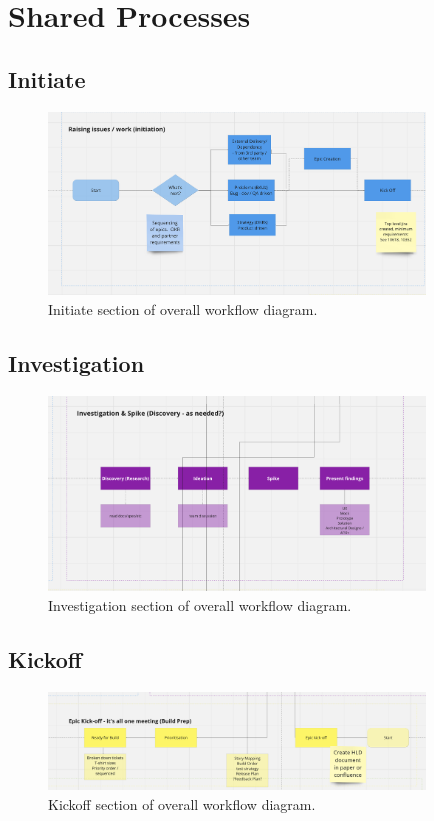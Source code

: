 \section{Shared Processes}

  \subsection{Initiate}
  \begin{figure}[H]
    \centering
    \includegraphics[width=10cm]{assets/workflow/initiate.png}
    \caption{Initiate section of overall workflow diagram.}
    \label{fig:workflowInitiate}
  \end{figure}

  \subsection{Investigation}
  \begin{figure}[H]
    \centering
    \includegraphics[width=10cm]{assets/workflow/investigation.png}
    \caption{Investigation section of overall workflow diagram.}
    \label{fig:workflowInvestigation}
  \end{figure}

  \subsection{Kickoff}
  \begin{figure}[H]
    \centering
    \includegraphics[width=10cm]{assets/workflow/kickoff.png}
    \caption{Kickoff section of overall workflow diagram.}
    \label{fig:workflowKickoff}
  \end{figure}

